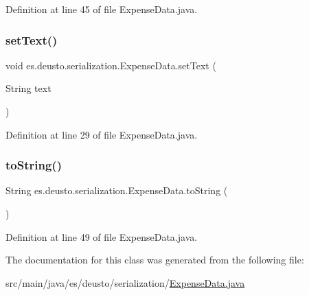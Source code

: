 Definition at line 45 of file Expense\+Data.\+java.

\mbox{\label{classes_1_1deusto_1_1serialization_1_1_expense_data_ae9cc50bc7eddb9ff751f5bb9a02eb0d4}} 
\subsubsection{\texorpdfstring{set\+Text()}{setText()}}
{\footnotesize\ttfamily void es.\+deusto.\+serialization.\+Expense\+Data.\+set\+Text (\begin{DoxyParamCaption}\item[{String}]{text }\end{DoxyParamCaption})}



Definition at line 29 of file Expense\+Data.\+java.

\mbox{\label{classes_1_1deusto_1_1serialization_1_1_expense_data_a89e0bc878ddf158ee69e56f26d0aa8e0}} 
\subsubsection{\texorpdfstring{to\+String()}{toString()}}
{\footnotesize\ttfamily String es.\+deusto.\+serialization.\+Expense\+Data.\+to\+String (\begin{DoxyParamCaption}{ }\end{DoxyParamCaption})}



Definition at line 49 of file Expense\+Data.\+java.



The documentation for this class was generated from the following file\+:\begin{DoxyCompactItemize}
\item 
src/main/java/es/deusto/serialization/\hyperlink{_expense_data_8java}{Expense\+Data.\+java}\end{DoxyCompactItemize}

